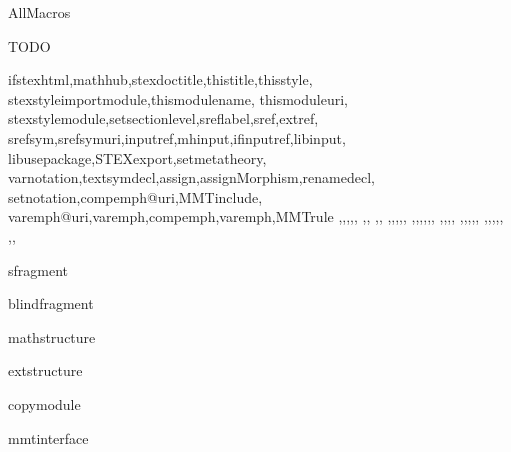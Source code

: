 \documentclass{stex}
\begin{document}
  \begin{smodule}{AllMacros}

  \begin{sfragment}{TODO}

    \begin{sfunction}{
      ifstexhtml,mathhub,stexdoctitle,thistitle,thisstyle,
      stexstyleimportmodule,thismodulename,
      thismoduleuri,
      stexstylemodule,setsectionlevel,sreflabel,sref,extref,
      srefsym,srefsymuri,inputref,mhinput,ifinputref,libinput,
      libusepackage,STEXexport,setmetatheory,
      varnotation,textsymdecl,assign,assignMorphism,renamedecl,
      setnotation,compemph@uri,MMTinclude,
      varemph@uri,varemph,compemph,varemph,MMTrule
    }{\ifstexhtml,\mathhub,\stexdoctitle,\thistitle,\thisstyle,
    \stexstyleimportmodule,\thismodulename,
    \thismoduleuri,\textsymdecl,
    \stexstylemodule,\setsectionlevel,\sreflabel,\sref,\extref,
    \srefsym,\srefsymuri,,\mhinput,\ifinputref,\libinput,
    \libusepackage,\varnotation,\STEXexport,\setmetatheory,
    \assign,\assignMorphism,\renamedecl,\setnotation,\compemph@uri,
    \MMTinclude,\varseqin,\varseq,\varemph@uri,\varemph,
    \compemph,\varemph,\MMTrule
    }
    \end{sfunction}

    \begin{senv}{sfragment}\end{senv}
    \begin{senv}{blindfragment}\end{senv}
    \begin{senv}{mathstructure}\end{senv}
    \begin{senv}{extstructure}\end{senv}
    \begin{senv}{copymodule}\end{senv}
    \begin{senv}{mmtinterface}\end{senv}

  \end{sfragment}
  \end{smodule}
\end{document}
